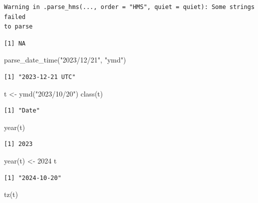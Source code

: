 \documentclass[
  letterpaper,
  DIV=11,
  numbers=noendperiod]{scrreprt}
\newenvironment{Shaded}{\begin{snugshade}}{\end{snugshade}}
\newcommand{\DecValTok}[1]{\textcolor[rgb]{0.68,0.00,0.00}{#1}}
\newcommand{\FunctionTok}[1]{\textcolor[rgb]{0.28,0.35,0.67}{#1}}
\newcommand{\NormalTok}[1]{\textcolor[rgb]{0.00,0.23,0.31}{#1}}
\newcommand{\OtherTok}[1]{\textcolor[rgb]{0.00,0.23,0.31}{#1}}
\newcommand{\StringTok}[1]{\textcolor[rgb]{0.13,0.47,0.30}{#1}}
\begin{document}
\begin{verbatim}
Warning in .parse_hms(..., order = "HMS", quiet = quiet): Some strings failed
to parse
\end{verbatim}

\begin{verbatim}
[1] NA
\end{verbatim}

\begin{Shaded}
\begin{Highlighting}[]
\FunctionTok{parse\_date\_time}\NormalTok{(}\StringTok{"2023/12/21"}\NormalTok{, }\StringTok{"ymd"}\NormalTok{)}
\end{Highlighting}
\end{Shaded}

\begin{verbatim}
[1] "2023-12-21 UTC"
\end{verbatim}

\begin{Shaded}
\begin{Highlighting}[]
\NormalTok{t }\OtherTok{\textless{}{-}} \FunctionTok{ymd}\NormalTok{(}\StringTok{"2023/10/20"}\NormalTok{)}
\FunctionTok{class}\NormalTok{(t)}
\end{Highlighting}
\end{Shaded}

\begin{verbatim}
[1] "Date"
\end{verbatim}

\begin{Shaded}
\begin{Highlighting}[]
\FunctionTok{year}\NormalTok{(t)}
\end{Highlighting}
\end{Shaded}

\begin{verbatim}
[1] 2023
\end{verbatim}

\begin{Shaded}
\begin{Highlighting}[]
\FunctionTok{year}\NormalTok{(t) }\OtherTok{\textless{}{-}} \DecValTok{2024}
\NormalTok{t}
\end{Highlighting}
\end{Shaded}

\begin{verbatim}
[1] "2024-10-20"
\end{verbatim}

\begin{Shaded}
\begin{Highlighting}[]
\FunctionTok{tz}\NormalTok{(t)}
\end{Highlighting}
\end{Shaded}
\end{document}
